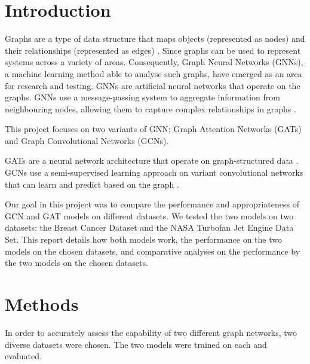 \documentclass[12pt]{article}
\begin{document}
\pagebreak
\renewcommand{\cftdotsep}{0.5}
\renewcommand{\cftsecleader}{\cftdotfill{\cftdotsep}}
\renewcommand{\contentsname}{Table of Contents}  %
\setlength{\cftbeforesecskip}{10pt}   %
\setlength{\cftbeforesubsecskip}{10pt} %
\setlength{\cftbeforesubsubsecskip}{10pt} %
\renewcommand{\cftsecpresnum}{Chapter~} %
\renewcommand{\cftsecaftersnum}{\quad} 
\setlength{\cftsecnumwidth}{6.1em}   %
\tableofcontents

\pagebreak
{}
\section{Introduction}

Graphs are a type of data structure that maps objects (represented as nodes) and their relationships (represented as edges) \cite{zhouGraphNeuralNetworks2020}. 
Since graphs can be used to represent systems across a variety of areas. Consequently, Graph Neural Networks (GNNs), a machine learning method able to analyse such graphs, have emerged as an area for research and testing. GNNs are artificial neural networks that operate on the graphs. 
GNNs use a message-passing system to aggregate information from neighbouring nodes, allowing them to capture complex relationships in graphs \cite{wuGraphNeuralNetworks2022}.

This project focuses on two variants of GNN:  Graph Attention Networks (GATs) and Graph Convolutional Networks (GCNs).

GATs are a neural network architecture that operate on graph-structured data \cite{nobleWhatGraphNeural2025}.
GCNs use a semi-supervised learning approach on variant convolutional networks that can learn and predict based on the graph \cite{nobleWhatGraphNeural2025}.

Our goal in this project was to compare the performance and appropriateness of GCN and GAT models on different datasets. We tested the two models on two datasets: the Breast Cancer Dataset and the NASA Turbofan Jet Engine Data Set. This report details how both models work, the performance on the two models on the chosen datasets, and comparative analyses on the performance by the two models on the chosen datasets.


\pagebreak
\section{Methods}
In order to accurately assess the capability of two different graph networks, two diverse datasets were chosen. The two models were trained on each and evaluated.
\end{document}
